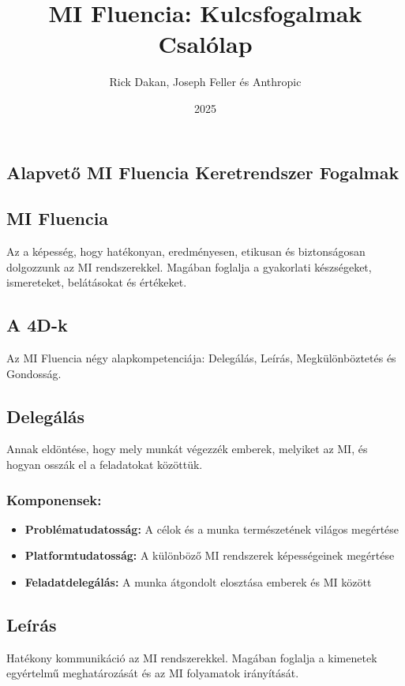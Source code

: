 \documentclass[a4paper, 11pt]{article}
\makeatletter
\renewcommand{\maketitle}{
  \begin{center}
    {\fontsize{20}{24}\bfseries\color{primary}\@title}
    \vspace{0.3em}
    {\color{lightgray}\titlerule[2pt]}
    \vspace{1em}
  \end{center}
}
\makeatother
\begin{document}
\title{MI Fluencia: Kulcsfogalmak Csalólap}
\author{Rick Dakan, Joseph Feller és Anthropic}
\date{2025}
\maketitle

\begin{multicols}{2}

\section{Alapvető MI Fluencia Keretrendszer Fogalmak}

\subsection{MI Fluencia}
Az a képesség, hogy hatékonyan, eredményesen, etikusan és biztonságosan dolgozzunk az MI rendszerekkel. Magában foglalja a gyakorlati készségeket, ismereteket, belátásokat és értékeket.

\subsection{A 4D-k}
Az MI Fluencia négy alapkompetenciája: Delegálás, Leírás, Megkülönböztetés és Gondosság.

\subsection{Delegálás}
Annak eldöntése, hogy mely munkát végezzék emberek, melyiket az MI, és hogyan osszák el a feladatokat közöttük.

\subsubsection{Komponensek:}
\begin{itemize}
\item \textbf{Problématudatosság:} A célok és a munka természetének világos megértése
\item \textbf{Platformtudatosság:} A különböző MI rendszerek képességeinek megértése  
\item \textbf{Feladatdelegálás:} A munka átgondolt elosztása emberek és MI között
\end{itemize}

\subsection{Leírás}
Hatékony kommunikáció az MI rendszerekkel. Magában foglalja a kimenetek egyértelmű meghatározását és az MI folyamatok irányítását.


\end{multicols}
\end{document}

